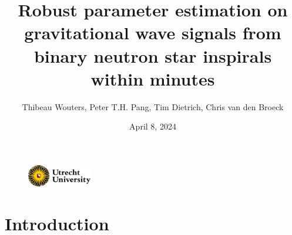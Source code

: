 \documentclass[usenames,dvipsnames,t]{beamer}
\title[Extreme matter] %
{Robust parameter estimation on gravitational wave signals from binary neutron star inspirals within minutes}
\author[Thibeau Wouters]{\small{Thibeau Wouters, Peter T.H. Pang, Tim Dietrich, Chris van den Broeck}}
\date{April 8, 2024}
\begin{document}
{


\begin{frame}[plain]
\titlepage

\begin{figure}
\centering
\includegraphics[width=0.25\textwidth]{Figures/utrecht-university.png}
\end{figure}

\end{frame}
}








\section{Introduction}
\end{document}
